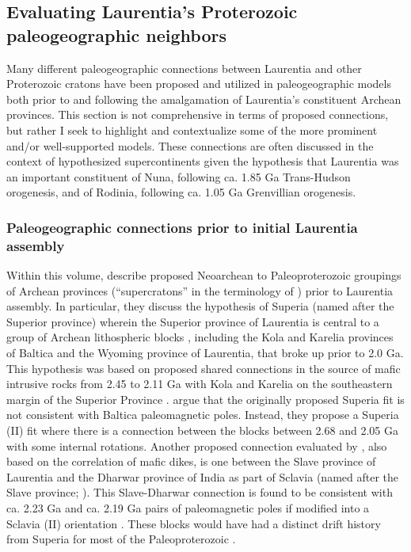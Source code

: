 \documentclass[twocolumn, switch]{article} %
\begin{document}
\subsection{Evaluating Laurentia's Proterozoic paleogeographic neighbors}

Many different paleogeographic connections between Laurentia and other Proterozoic cratons have been proposed and utilized in paleogeographic models both prior to and following the amalgamation of Laurentia's constituent Archean provinces. This section is not comprehensive in terms of proposed connections, but rather I seek to highlight and contextualize some of the more prominent and/or well-supported models. These connections are often discussed in the context of hypothesized supercontinents given the hypothesis that Laurentia was an important constituent of Nuna, following ca. 1.85 Ga Trans-Hudson orogenesis, and of Rodinia, following ca. 1.05 Ga Grenvillian orogenesis. 

\subsubsection{Paleogeographic connections prior to initial Laurentia assembly}

Within this volume, \cite{Salminen2021a} describe proposed Neoarchean to Paleoproterozoic groupings of Archean provinces (``supercratons'' in the terminology of \citealp{Bleeker2003a}) prior to Laurentia assembly. In particular, they discuss the hypothesis of Superia (named after the Superior province) wherein the Superior province of Laurentia is central to a group of Archean lithospheric blocks \citep{Bleeker2006a}, including the Kola and Karelia provinces of Baltica and the Wyoming province of Laurentia, that broke up prior to 2.0 Ga. This hypothesis was based on proposed shared connections in the source of mafic intrusive rocks from 2.45 to 2.11 Ga with Kola and Karelia on the southeastern margin of the Superior Province \citep{Davey2020a}. \cite{Salminen2021a}  argue that the originally proposed Superia fit is not consistent with Baltica paleomagnetic poles. Instead, they propose a Superia (II) fit where there is a connection between the blocks between 2.68 and 2.05 Ga with some internal rotations. Another proposed connection evaluated by \cite{Salminen2021a}, also based on the correlation of mafic dikes, is one between the Slave province of Laurentia and the Dharwar province of India \citep{French2010a} as part of Sclavia (named after the Slave province; \citealp{Bleeker2003a}). This Slave-Dharwar connection is found to be consistent with ca. 2.23 Ga and ca. 2.19 Ga pairs of paleomagnetic poles if modified into a Sclavia (II) orientation \citep{Salminen2021a}. These blocks would have had a distinct drift history from Superia for most of the Paleoproterozoic \citep{Salminen2021a}.
\end{document}
